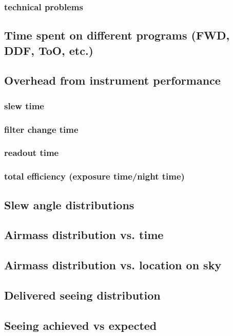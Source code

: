 \subsubsection{technical problems}
\label{sec:org84910c5}
\subsection{Time spent on different programs (FWD, DDF, ToO, etc.)}
\label{sec:org1a662a9}
\subsection{Overhead from instrument performance}
\label{sec:org9dcc1b2}
\subsubsection{slew time}
\label{sec:org610f156}
\subsubsection{filter change time}
\label{sec:org3f15a04}
\subsubsection{readout time}
\label{sec:orgc8f69fd}
\subsubsection{total efficiency (exposure time/night time)}
\label{sec:org489b0e0}
\subsection{Slew angle distributions}
\label{sec:org750750b}
\subsection{Airmass distribution vs. time}
\label{sec:orgf5364a4}
\subsection{Airmass distribution vs. location on sky}
\label{sec:org61828c5}
\subsection{Delivered seeing distribution}
\label{sec:orgd969073}
\subsection{Seeing achieved vs expected}
\label{sec:org8c30700}
